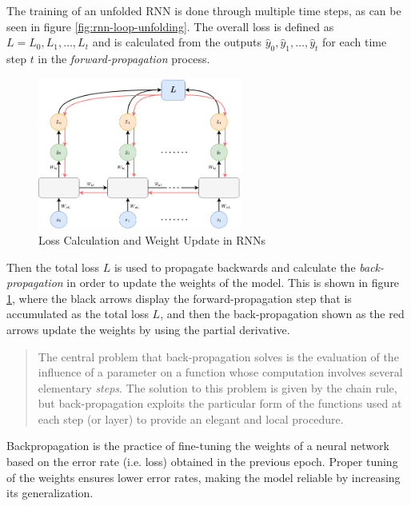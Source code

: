             The training of an unfolded RNN is done through multiple time steps, as can be seen in figure \ref{fig:rnn-loop-unfolding}.
            The overall loss is defined as $L = L_0, L_1, \dots, L_t$ and is calculated from the outputs $\hat{y}_0, \hat{y}_1, \dots, \hat{y}_t$  for each time step $t$ in the \emph{forward-propagation} process.
            \begin{figure}[h!]
                \centering
                \includegraphics[width=0.6\textwidth]{figures/rnn_loss_calculation.drawio.png}
                \caption{Loss Calculation and Weight Update in RNNs}
                \label{fig:loss-calculation-weight-update-rnn}
            \end{figure}
            Then the total loss $L$ is used to propagate backwards and calculate the \emph{back-propagation} in order to update the weights of the model.
            This is shown in figure \ref{fig:loss-calculation-weight-update-rnn}, where the black arrows display the forward-propagation step that is accumulated as the total loss $L$, and then the back-propagation shown as the red arrows update the weights by using the partial derivative.

            \begin{quote}
                The central problem that back-propagation solves is the evaluation of the influence of a parameter on a function whose computation involves several elementary \emph{steps}. The solution to this problem is given by the chain rule, but back-propagation exploits the particular form of the functions used at each step (or layer) to provide an elegant and local procedure. \cite{lecunTheoreticalFrameworkBackpropagation1988}
            \end{quote}
            Backpropagation is the practice of fine-tuning the weights of a neural network based on the error rate (i.e. loss) obtained in the previous epoch. Proper tuning of the weights ensures lower error rates, making the model reliable by increasing its generalization.



